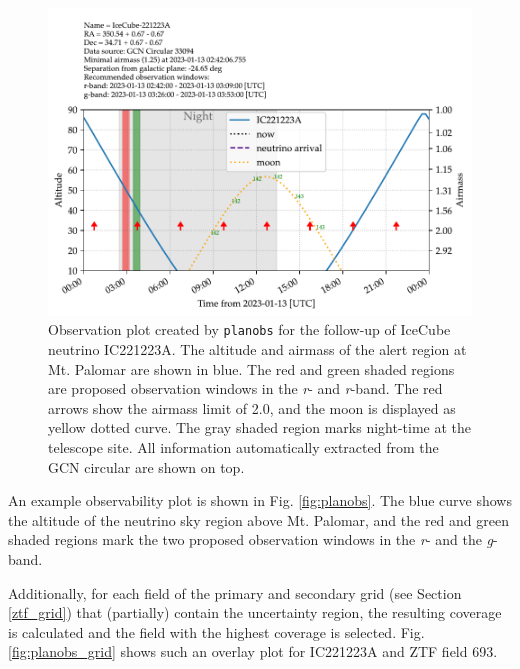 \documentclass[
    a4paper, %
    fontsize=10pt, %
    twoside=true, %
    numbers=noenddot, %
    fontmethod=tex,
]{kaobook}
\begin{document}
\begin{figure}[h!]
    \includegraphics{fu/planobs_airmass.pdf}
    \caption[Observation plan]{Observation plot created by \texttt{planobs} for the follow-up of IceCube neutrino IC221223A. The altitude and airmass of the alert region at Mt. Palomar are shown in blue. The red and green shaded regions are proposed observation windows in the \textit{r}- and \textit{r}-band. The red arrows show the airmass limit of 2.0, and the moon is displayed as yellow dotted curve. The gray shaded region marks night-time at the telescope site. All information automatically extracted from the GCN circular are shown on top.}
\end{figure}

An example observability plot is shown in Fig. \ref{fig:planobs}. The blue curve shows the altitude of the neutrino sky region above Mt. Palomar, and the red and green shaded regions mark the two proposed observation windows in the \textit{r}- and the \textit{g}-band.

Additionally, for each field of the primary and secondary grid (see Section \ref{ztf_grid}) that (partially) contain the uncertainty region, the resulting coverage is calculated and the field with the highest coverage is selected. Fig. \ref{fig:planobs_grid} shows such an overlay plot for IC221223A and ZTF field 693.
\end{document}
